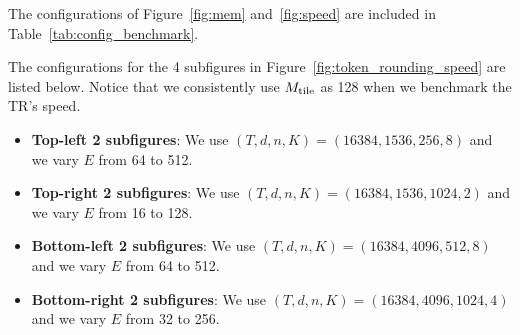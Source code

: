 

The configurations of Figure~\ref{fig:mem} and~\ref{fig:speed} are included in Table~\ref{tab:config_benchmark}.




% 


The configurations for the 4 subfigures in Figure~\ref{fig:token_rounding_speed} are listed below. Notice that we consistently use $M_\mathrm{tile}$ as 128 when we benchmark the TR's speed.
\begin{itemize}
    \item \textbf{Top-left 2 subfigures}: We use $(T,d,n,K)=(16384,1536,256,8)$ and we vary $E$ from 64 to 512.

    \item \textbf{Top-right 2 subfigures}: We use $(T,d,n,K)=(16384,1536,1024,2)$ and we vary $E$ from 16 to 128.

    \item \textbf{Bottom-left 2 subfigures}: We use $(T,d,n,K)=(16384,4096,512,8)$ and we vary $E$ from 64 to 512.

    \item \textbf{Bottom-right 2 subfigures}: We use $(T,d,n,K)=(16384,4096,1024,4)$ and we vary $E$ from 32 to 256.
\end{itemize}
